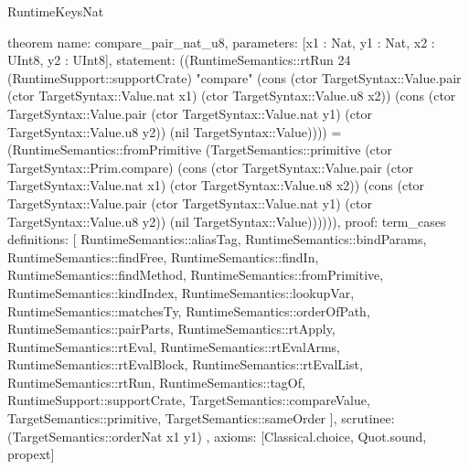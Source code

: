 \begin{lexlean}{RuntimeKeysNat}
\begin{semanticmodule}
theorem{
  name: compare_pair_nat_u8,
  parameters: [x1 : Nat, y1 : Nat, x2 : UInt8, y2 : UInt8],
  statement: ((RuntimeSemantics::rtRun 24 (RuntimeSupport::supportCrate) "compare" (cons (ctor TargetSyntax::Value.pair (ctor TargetSyntax::Value.nat x1) (ctor TargetSyntax::Value.u8 x2)) (cons (ctor TargetSyntax::Value.pair (ctor TargetSyntax::Value.nat y1) (ctor TargetSyntax::Value.u8 y2)) (nil TargetSyntax::Value)))) = (RuntimeSemantics::fromPrimitive (TargetSemantics::primitive (ctor TargetSyntax::Prim.compare) (cons (ctor TargetSyntax::Value.pair (ctor TargetSyntax::Value.nat x1) (ctor TargetSyntax::Value.u8 x2)) (cons (ctor TargetSyntax::Value.pair (ctor TargetSyntax::Value.nat y1) (ctor TargetSyntax::Value.u8 y2)) (nil TargetSyntax::Value)))))),
  proof: term_cases{
    definitions: [
      RuntimeSemantics::aliasTag,
      RuntimeSemantics::bindParams,
      RuntimeSemantics::findFree,
      RuntimeSemantics::findIn,
      RuntimeSemantics::findMethod,
      RuntimeSemantics::fromPrimitive,
      RuntimeSemantics::kindIndex,
      RuntimeSemantics::lookupVar,
      RuntimeSemantics::matchesTy,
      RuntimeSemantics::orderOfPath,
      RuntimeSemantics::pairParts,
      RuntimeSemantics::rtApply,
      RuntimeSemantics::rtEval,
      RuntimeSemantics::rtEvalArms,
      RuntimeSemantics::rtEvalBlock,
      RuntimeSemantics::rtEvalList,
      RuntimeSemantics::rtRun,
      RuntimeSemantics::tagOf,
      RuntimeSupport::supportCrate,
      TargetSemantics::compareValue,
      TargetSemantics::primitive,
      TargetSemantics::sameOrder
    ],
    scrutinee: (TargetSemantics::orderNat x1 y1)
  },
  axioms: [Classical.choice, Quot.sound, propext]
}


\end{semanticmodule}
\end{lexlean}
